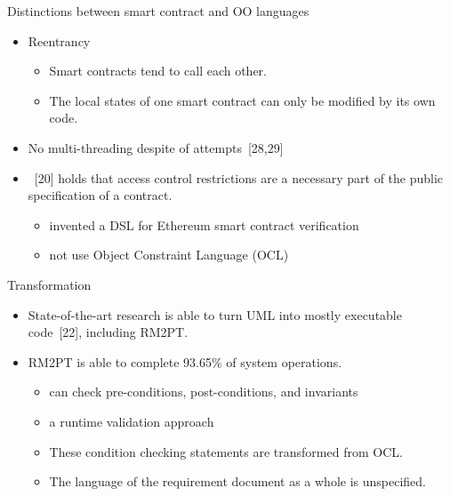 \documentclass[xcolor=svgnames]{beamer}
\begin{document}
\begin{frame}{Distinctions between smart contract and OO languages}

\begin{itemize}
\item Reentrancy
	\begin{itemize}
	\item Smart contracts tend to call each other.
	\item The local states of one smart contract can only be modified by its own code.
	\end{itemize}

\item No multi-threading despite of attempts~[28,29]

\item {}~[20] holds that access control restrictions are a necessary part of the public specification of a contract.
\begin{itemize}
\item invented a DSL for Ethereum smart contract verification
\item not use Object Constraint Language (OCL)
\end{itemize}
\end{itemize}
\end{frame}


\begin{frame}{Transformation}

\begin{itemize}
\item State-of-the-art research is able to turn UML into mostly executable code~[22], including RM2PT.
\item RM2PT is able to complete 93.65\% of system operations.
\begin{itemize}
\item can check pre-conditions, post-conditions, and invariants
\item a runtime validation approach
\item<2-> These condition checking statements are transformed from OCL.
\item<3-> The language of the requirement document as a whole is unspecified.
\end{itemize}

\end{itemize}

\end{frame}
\end{document}
